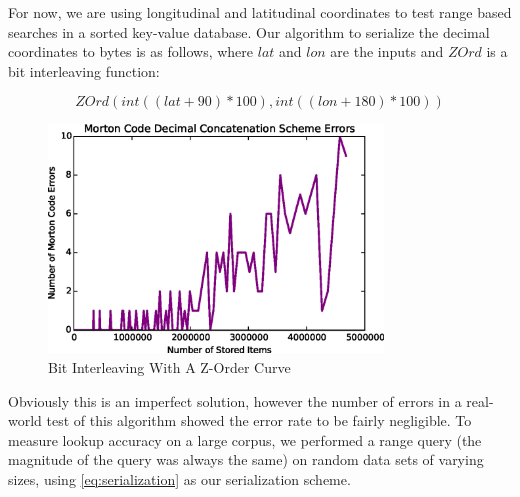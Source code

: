 \documentclass[10pt]{IEEEtran}
\newcommand*\Let[2]{\State #1 $\gets$ #2}
\newcommand*\Append[2]{\State #1$.append($#2$)$}
\begin{document}
\par For now, we are using longitudinal and latitudinal coordinates to test range based searches in a sorted key-value database. Our algorithm to serialize the decimal coordinates to bytes is as follows, where $lat$ and $lon$ are the inputs and $ZOrd$ is a bit interleaving function:

\begin{equation} \label{eq:serialization}
ZOrd(int((lat + 90) * 100), int((lon + 180) * 100))
\end{equation}

\begin{figure}[!t]
\centering
\includegraphics[width=3.5in]{errors.eps}
\caption{Bit Interleaving With A Z-Order Curve}
\label{fig_ZOrd}
\end{figure}

\par Obviously this is an imperfect solution, however the number of errors in a real-world test of this algorithm showed the error rate to be fairly negligible. To measure lookup accuracy on a large corpus, we performed a range query (the magnitude of the query was always the same) on random data sets of varying sizes, using \ref{eq:serialization} as our serialization scheme.
        
\end{document}
